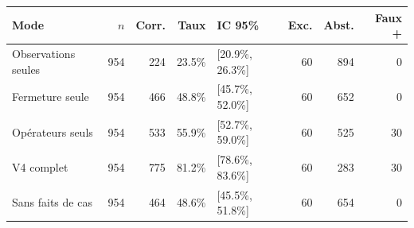 \documentclass[11pt,a4paper]{article}
\begin{document}
\scriptsize\setlength{\tabcolsep}{1.5pt}
\begin{longtable}{p{}rrrp{}rrr}
\toprule Mode & $n$ & Corr. & Taux & IC 95\% & Exc. & Abst. & Faux + \\
\midrule

Observations seules & 954 & 224 & 23.5\% & [20.9\%, 26.3\%] & 60 & 894 & 0 \\
Fermeture seule & 954 & 466 & 48.8\% & [45.7\%, 52.0\%] & 60 & 652 & 0 \\
Opérateurs seuls & 954 & 533 & 55.9\% & [52.7\%, 59.0\%] & 60 & 525 & 30 \\
V4 complet & 954 & 775 & 81.2\% & [78.6\%, 83.6\%] & 60 & 283 & 30 \\
Sans faits de cas & 954 & 464 & 48.6\% & [45.5\%, 51.8\%] & 60 & 654 & 0 \\
\bottomrule
\end{longtable}
\normalsize\setlength{\tabcolsep}{6pt}
\end{document}

